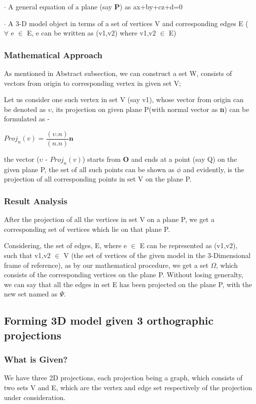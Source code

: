 \documentclass[12pt]{article}
\begin{document}
$\cdot$ A general equation of a plane (say \textbf{P}) as ax+by+cz+d=0 

$\cdot$ A 3-D model object in terms of a set of vertices V and corresponding edges E ($\forall$ e $\in$ E, e can be written as (v1,v2) where v1,v2 $\in$ E)

\subsubsection{Mathematical Approach}

As mentioned in Abstract subsection, we can construct a set W, consists of vectors from origin to corresponding vertex in given set V;

Let us consider one such vertex in set V (say v1), whose vector from origin can be denoted as \textbf{$\upsilon$}, its projection on given plane P(with normal vector as \textbf{n}) can be formulated as - 

\textbf{$Proj_{n}(v) = \dfrac{(\upsilon.n)}{(n.n)}\textbf{n}$}

the vector ($\upsilon$ - $Proj_{n}(v)$) starts from \textbf{O} and ends at a point (say Q) on the given plane P, the set of all such points can be shown as $\phi$ and evidently, is the projection of all corresponding points in set V on the plane P.

\subsubsection{Result Analysis}

After the projection of all the vertices in set V on a plane P, we get a corresponding set of vertices which lie on that plane P.

Considering, the set of edges, E, where e $\in$ E can be represented as (v1,v2), such that v1,v2 $\in$ V (the set of vertices of the given model in the 3-Dimensional frame of reference), as by our mathematical procedure, we get a set $\Omega$, which consists of the corresponding vertices on the plane P. Without losing generalty, we can say that all the edges in set E has been projected on the plane P, with the new set named as $\Psi$.

\subsection{Forming 3D model given 3 orthographic projections}

\subsubsection{What is Given?}
We have three 2D projections, each projection being a graph, which consists of two sets V and E, which are the vertex and edge set respectively of the projection under consideration.
\end{document}
